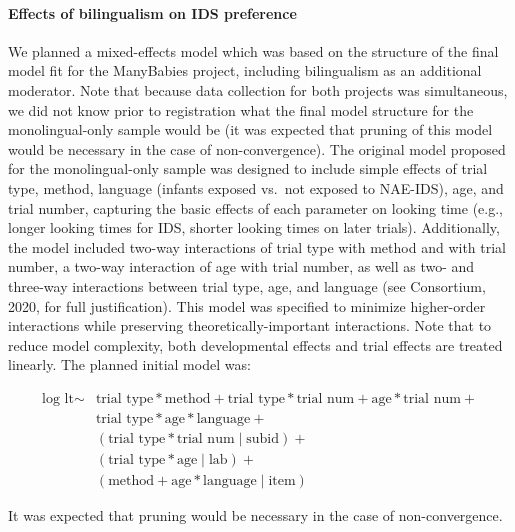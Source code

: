 \documentclass[,man,floatsintext]{apa6}
\let\oldparagraph\paragraph
\renewcommand{\paragraph}[1]{\oldparagraph{#1}\mbox{}}
\begin{document}
\hypertarget{effects-of-bilingualism-on-ids-preference}{%
\paragraph{Effects of bilingualism on IDS preference}\label{effects-of-bilingualism-on-ids-preference}}

We planned a mixed-effects model which was based on the structure of the final model fit for the ManyBabies project, including bilingualism as an additional moderator. Note that because data collection for both projects was simultaneous, we did not know prior to registration what the final model structure for the monolingual-only sample would be (it was expected that pruning of this model would be necessary in the case of non-convergence). The original model proposed for the monolingual-only sample was designed to include simple effects of trial type, method, language (infants exposed vs.~not exposed to NAE-IDS), age, and trial number, capturing the basic effects of each parameter on looking time (e.g., longer looking times for IDS, shorter looking times on later trials). Additionally, the model included two-way interactions of trial type with method and with trial number, a two-way interaction of age with trial number, as well as two- and three-way interactions between trial type, age, and language (see Consortium, 2020, for full justification). This model was specified to minimize higher-order interactions while preserving theoretically-important interactions. Note that to reduce model complexity, both developmental effects and trial effects are treated linearly. The planned initial model was:

\begin{equation}
\begin{split}
\text{log lt} \sim & \text{trial type} * \text{method} + \text{trial type} * \text{trial num} + \text{age} * \text{trial num} + \\
& \text{trial type} * \text{age} * \text{language} + \\
& (\text{trial type} * \text{trial num} \mid \text{subid}) + \\
& (\text{trial type} * \text{age} \mid \text{lab}) + \\
& (\text{method} + \text{age} * \text{language} \mid \text{item})
\end{split}
\end{equation}

It was expected that pruning would be necessary in the case of non-convergence.
\end{document}
